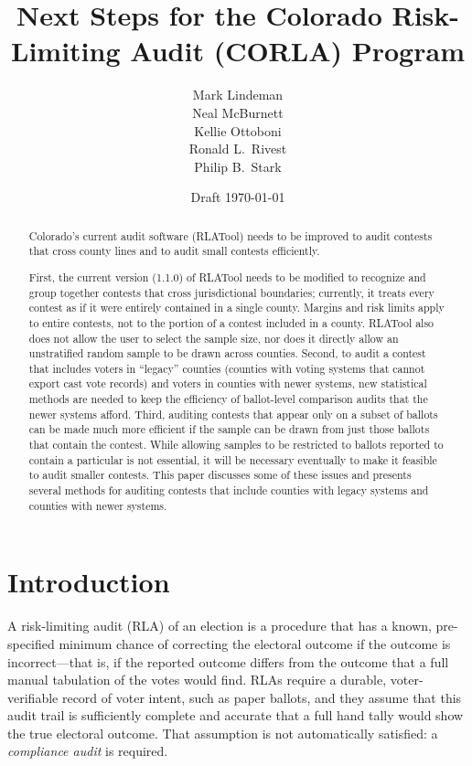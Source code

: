 \documentclass[12pt]{article}
\title{Next Steps for the Colorado Risk-Limiting Audit (CORLA) Program}
\author{
   Mark Lindeman\\
   Neal McBurnett\\
   Kellie Ottoboni\\
   Ronald L.~Rivest\\
   Philip B.~Stark
}
\date{Draft \today}
\begin{document}
\maketitle


\begin{abstract}
Colorado's current audit software (RLATool) needs to be improved to audit 
contests that cross county lines and to audit small contests efficiently.

First, the current version (1.1.0) of RLATool
needs to be modified to recognize and group together contests that cross jurisdictional
boundaries; currently, it treats every contest as if it were entirely
contained in a single county.
Margins and risk limits apply to entire contests, not to the portion of a contest
included in a county.
RLATool also does not allow the user to select the sample size, nor does
it directly allow an unstratified random sample to be drawn across counties.
Second, to audit a contest that includes voters in ``legacy'' counties 
(counties with voting systems that cannot export cast vote records) 
and voters in counties with newer systems, new statistical methods are needed to
keep the efficiency of ballot-level comparison audits that the newer systems
afford.
Third, auditing contests that appear only on a subset of ballots can
be made much more efficient if the sample can be drawn from just those ballots
that contain the contest.
While allowing samples to be restricted to ballots reported to contain a particular
is not essential, it will be necessary
eventually to make it feasible to audit smaller contests.
This paper discusses some of these issues and presents several
methods for auditing contests that include counties with
legacy systems and counties with newer systems.  
\end{abstract}

\section{Introduction}
A risk-limiting audit (RLA) of an election is a procedure that
has a known, pre-specified minimum chance of correcting the electoral outcome if the outcome
is incorrect---that is, if the reported outcome differs from the outcome that a full manual
tabulation of the votes would find. 
RLAs require a durable, voter-verifiable record of voter intent, such as paper ballots,
and they assume that this audit trail is sufficiently complete and accurate that a full hand
tally would show the true electoral outcome.
That assumption is not automatically satisfied: a \emph{compliance audit}
\citep{starkWagner12} 
is required.
\end{document}
